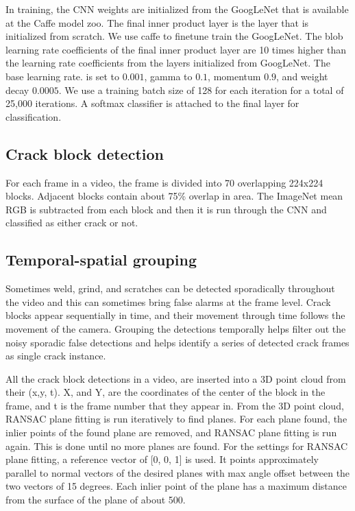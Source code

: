                In training, the CNN weights are initialized from the GoogLeNet that is available at the Caffe model zoo. The final inner product layer is the layer that is initialized from scratch. We use caffe \cite{jia2014} to finetune train the GoogLeNet.  The blob learning rate coefficients of the final inner product layer are 10 times higher than the learning rate coefficients from the layers initialized from GoogLeNet.  The base learning rate. is set to  $0.001$,   gamma to $0.1$, momentum $0.9$, and weight decay $0.0005$.  We use a training batch size of 128 for each iteration for a total of 25,000 iterations.  A softmax classifier is attached to the final layer for classification.
                
                
    \subsection{Crack block detection}
                For each frame in a video, the frame is divided into 70 overlapping 224x224 blocks. Adjacent blocks contain about 75\% overlap in area. The ImageNet mean RGB is subtracted from each block and then it is run through the CNN and classified as either crack or not.
    
    
    \subsection{Temporal-spatial grouping}
                Sometimes weld, grind, and scratches can be detected sporadically throughout the video and this can sometimes bring false alarms at the frame level. Crack blocks appear sequentially in time, and their movement through time follows the movement of the camera.  Grouping the detections temporally helps filter out the noisy sporadic false detections and helps identify a series of detected crack frames as single crack instance.
                
                All the crack block detections in a video, are inserted into a 3D point cloud from their (x,y, t). X, and Y, are the coordinates of the center of the block in the frame, and t is the frame number that they appear in.   From the 3D point cloud, RANSAC plane fitting is run iteratively to find planes.  For each plane found, the inlier points of the found plane are removed, and RANSAC plane fitting is run again. This is done until no more planes are found.  For the settings for RANSAC plane fitting, a reference vector of [0, 0, 1] is used. It points approximately parallel to normal vectors of the desired planes with max angle offset between the two vectors of 15 degrees. Each inlier point of the plane has a maximum distance from the surface of the plane of about 500.  
    
